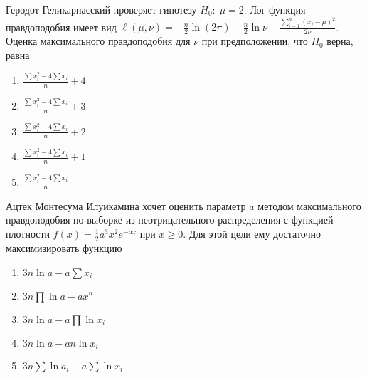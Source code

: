 \documentclass[t]{beamer}
\begin{document}
 \begin{frame} \label{51} 
\begin{block}{51} 

Геродот Геликарнасский проверяет гипотезу $H_0: \; \mu=2$. Лог-функция правдоподобия имеет вид $\ell(\mu,\nu)=-\frac{n}{2}\ln (2\pi)-\frac{n}{2}\ln \nu -\frac{\sum_{i=1}^n(x_i-\mu)^2}{2\nu}$. Оценка максимального правдоподобия для $\nu$ при предположении, что $H_0$ верна, равна
 


 \end{block} 
\begin{enumerate} 
\item[] \hyperlink{51-Yes}{\beamergotobutton{}$\frac{\sum x_i^2 - 4\sum x_i}{n}+4$}
\item[] \hyperlink{51-No}{\beamergotobutton{} $\frac{\sum x_i^2 - 4\sum x_i}{n}+3$}
\item[] \hyperlink{51-No}{\beamergotobutton{} $\frac{\sum x_i^2 - 4\sum x_i}{n}+2$}
\item[] \hyperlink{51-No}{\beamergotobutton{} $\frac{\sum x_i^2 - 4\sum x_i}{n}+1$}
\item[] \hyperlink{51-No}{\beamergotobutton{} $\frac{\sum x_i^2 - 4\sum x_i}{n}$}
\end{enumerate} 
\end{frame} 


 \begin{frame} \label{52} 
\begin{block}{52} 

Ацтек Монтесума Илуикамина хочет оценить параметр $a$ методом максимального правдоподобия по выборке из неотрицательного распределения с функцией плотности $f(x)=\frac{1}{2}a^3x^2e^{-ax}$ при $x\geq 0$. Для этой цели ему достаточно максимизировать функцию
 


 \end{block} 
\begin{enumerate} 
\item[] \hyperlink{52-Yes}{\beamergotobutton{} $3n \ln a - a \sum x_i$}
\item[] \hyperlink{52-No}{\beamergotobutton{} $3n\prod \ln a - a x^n$}
\item[] \hyperlink{52-No}{\beamergotobutton{} $3n\ln a - a \prod \ln x_i$}
\item[] \hyperlink{52-No}{\beamergotobutton{} $3n \ln a - an \ln x_i$}
\item[] \hyperlink{52-No}{\beamergotobutton{} $3n \sum \ln a_i - a \sum \ln x_i$}
\end{enumerate} 
\end{frame} 
\end{document}
